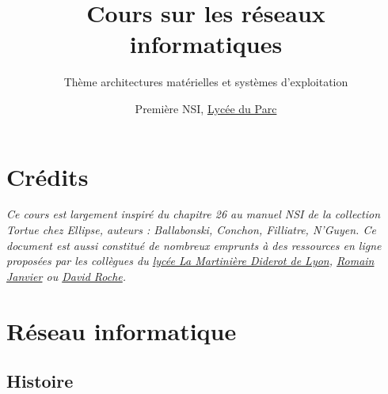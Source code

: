\documentclass[
  11pt,
]{article}
\title{Cours sur les réseaux informatiques}
\subtitle{Thème architectures matérielles et systèmes d'exploitation}
\author{Première NSI, \href{https://frederic-junier.org/}{Lycée du
Parc}}
\date{}
\newcounter{prop}
\newcounter{cours}
\newcounter{histo}
\begin{document}
\maketitle

\renewcommand*\contentsname{Table des matières}
{
\hypersetup{linkcolor=}
\setcounter{tocdepth}{3}
\tableofcontents
}
\hypertarget{cruxe9dits}{%
\section*{Crédits}\label{cruxe9dits}}

\emph{Ce cours est largement inspiré du chapitre 26 au manuel NSI de la
collection Tortue chez Ellipse, auteurs : Ballabonski, Conchon,
Filliatre, N'Guyen. Ce document est aussi constitué de nombreux emprunts
à des ressources en ligne proposées par les collègues du
\href{http://portail.lyc-la-martiniere-diderot.ac-lyon.fr/srv1/co/Div_6_Archi_OS_3.html}{lycée
La Martinière Diderot de Lyon},
\href{http://archives.janviercommelemois.fr/nsi/fichiers_pdf/feuille-internet.pdf}{Romain
Janvier} ou
\href{https://pixees.fr/informatiquelycee/n_site/nsi_prem.html}{David
Roche}.}

\hypertarget{ruxe9seau-informatique}{%
\section{Réseau informatique}\label{ruxe9seau-informatique}}

\hypertarget{histoire}{%
\subsection{Histoire}\label{histoire}}
\end{document}
